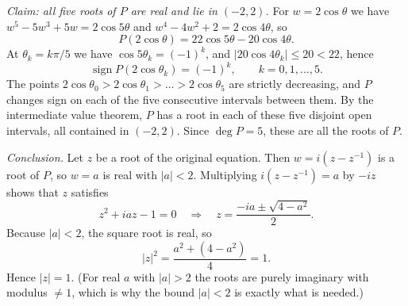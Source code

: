 \begin{solution}
    \medskip \noindent\emph{Claim: all five roots of \( P \) are real and lie in \( \left(-2, 2\right) \).} For \( w = 2\cos\theta \) we have \( w^5 - 5w^3 + 5w = 2\cos 5\theta \) and \( w^4 - 4w^2 + 2 = 2\cos 4\theta \), so
    \begin{equation*}
        P\left(2\cos\theta\right) = 22\cos 5\theta - 20\cos 4\theta.
    \end{equation*}
    At \( \theta_k = k\pi/5 \) we have \( \cos 5\theta_k = \left(-1\right)^k \), and \( |20\cos 4\theta_k| \le 20 < 22 \), hence
    \begin{equation*}
        \operatorname{sign} P\left(2\cos\theta_k\right) = \left(-1\right)^k, \qquad k = 0, 1, \dots, 5.
    \end{equation*}
    The points \( 2\cos\theta_0 > 2\cos\theta_1 > \dots > 2\cos\theta_5 \) are strictly decreasing, and \( P \) changes sign on each of the five consecutive intervals between them. By the intermediate value theorem, \( P \) has a root in each of these five disjoint open intervals, all contained in \( \left(-2, 2\right) \). Since \( \deg P = 5 \), these are all the roots of \( P \).

    \medskip \noindent\emph{Conclusion.} Let \( z \) be a root of the original equation. Then \( w = i\left(z - z^{-1}\right) \) is a root of \( P \), so \( w = a \) is real with \( |a| < 2 \). Multiplying \( i\left(z - z^{-1}\right) = a \) by \( -iz \) shows that \( z \) satisfies
    \begin{equation*}
        z^2 + iaz - 1 = 0 \quad\Longrightarrow\quad z = \frac{-ia \pm \sqrt{4 - a^2}}{2}.
    \end{equation*}
    Because \( |a| < 2 \), the square root is real, so
    \begin{equation*}
        |z|^2 = \frac{a^2 + \left(4 - a^2\right)}{4} = 1.
    \end{equation*}
    Hence \( |z| = 1 \). (For real \( a \) with \( |a| > 2 \) the roots are purely imaginary with modulus \( \neq 1 \), which is why the bound \( |a| < 2 \) is exactly what is needed.)
\end{solution}
